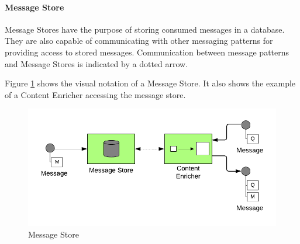 \paragraph{Message Store}

Message Stores have the purpose of storing consumed messages in a database. They are also capable of communicating with other messaging patterns for providing access to stored messages. Communication between message patterns and Message Stores is indicated by a dotted arrow.

Figure \ref{messaging:store} shows the visual notation of a Message Store. It also shows the example of a Content Enricher accessing the message store.

\begin{figure}[H]
    \centering
    \includegraphics[scale=0.6]{Diagrams/Messaging/12. Message Store.pdf}
    \caption{Message Store}
    \label{messaging:store}
\end{figure}

